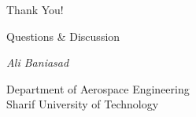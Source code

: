 \documentclass[
    11pt, %
    aspectratio=169, %
]{beamer}
\begin{document}
\appendix
{}

\begin{frame}[noframenumbering]
	\begin{center}
		{\LARGE Thank You!}
		
		\vspace{1cm}
		
		{\large Questions \& Discussion}
		
		\vspace{1cm}
		
			\textit{Ali Baniasad} 
		
		\vspace{0.5cm}
		
		Department of Aerospace Engineering \\ 
		Sharif University of Technology
	\end{center}
\end{frame}

\end{document}

